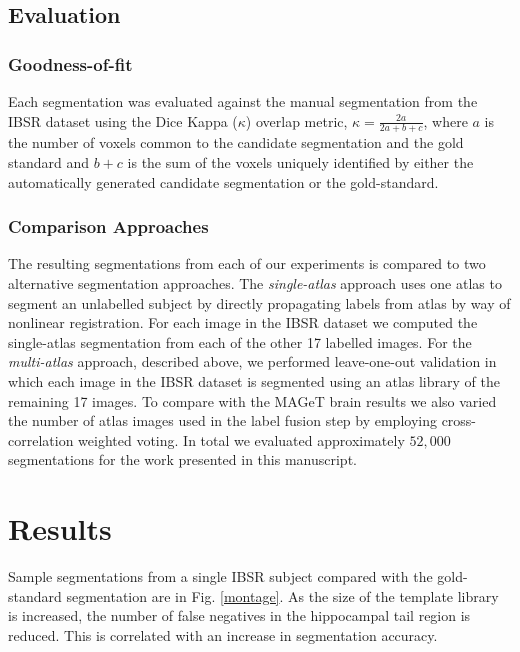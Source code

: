 \documentclass{article}
\begin{document}
\subsection{Evaluation}
\subsubsection{Goodness-of-fit}
Each segmentation was evaluated against the manual segmentation from the IBSR
dataset using the Dice Kappa ($\kappa$) overlap metric, $\kappa =
\frac{2a}{2a+b+c}$, where $a$ is the number of voxels common to the candidate
segmentation and the gold standard and $b+c$ is the sum of the voxels uniquely
identified by either the automatically generated candidate segmentation or the
gold-standard.

\subsubsection{Comparison Approaches}
The resulting segmentations from each of our experiments is compared to two
alternative segmentation approaches. The {\it single-atlas} approach uses one
atlas to segment an unlabelled subject by directly propagating labels from
atlas by way of nonlinear registration.  For each image in the IBSR dataset we
computed the single-atlas segmentation from each of the other 17 labelled
images. For the {\it multi-atlas} approach, described above, we performed
leave-one-out validation in which each image in the IBSR dataset is segmented
using an atlas library of the remaining 17 images. To compare with the MAGeT
brain results we also varied the number of atlas images used in the label
fusion step by employing cross-correlation weighted voting.  In total we
evaluated approximately $52,000$ segmentations for the work presented in this
manuscript.


\section{Results}

Sample segmentations from a single IBSR subject compared with the gold-standard
segmentation are in Fig.  \ref{montage}.  As the size of the template library
is increased, the number of false negatives in the hippocampal tail region is
reduced.  This is correlated with an increase in segmentation accuracy.
\end{document}
